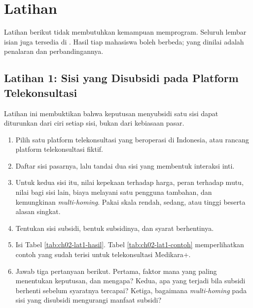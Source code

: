 \section{Latihan}

Latihan berikut tidak membutuhkan kemampuan memprogram. Seluruh lembar isian
juga tersedia di . Hasil tiap mahasiswa boleh
berbeda; yang dinilai adalah penalaran dan perbandingannya.

\subsection*{Latihan 1: Sisi yang Disubsidi pada Platform Telekonsultasi}

Latihan ini membuktikan bahwa keputusan menyubsidi satu sisi dapat diturunkan
dari ciri setiap sisi, bukan dari kebiasaan pasar.

\begin{enumerate}
  \item Pilih satu platform telekonsultasi yang beroperasi di Indonesia, atau
        rancang platform telekonsultasi fiktif.
  \item Daftar sisi pasarnya, lalu tandai dua sisi yang membentuk interaksi
        inti.
  \item Untuk kedua sisi itu, nilai kepekaan terhadap harga, peran terhadap
        mutu, nilai bagi sisi lain, biaya melayani satu pengguna tambahan, dan
        kemungkinan \textit{multi-homing}. Pakai skala rendah, sedang, atau
        tinggi beserta alasan singkat.
  \item Tentukan sisi subsidi, bentuk subsidinya, dan syarat berhentinya.
  \item Isi Tabel \ref{tab:ch02-lat1-hasil}. Tabel \ref{tab:ch02-lat1-contoh}
        memperlihatkan contoh yang sudah terisi untuk telekonsultasi
        Medikara+.
  \item Jawab tiga pertanyaan berikut. Pertama, faktor mana yang paling
        menentukan keputusan, dan mengapa? Kedua, apa yang terjadi bila
        subsidi berhenti sebelum syaratnya tercapai? Ketiga, bagaimana
        \textit{multi-homing} pada sisi yang disubsidi mengurangi manfaat
        subsidi?
\end{enumerate}

